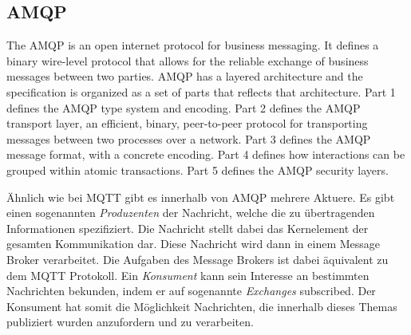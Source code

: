 \subsection{AMQP}

\begin{definition}
    The \ac{AMQP} is an open internet protocol for business messaging. It defines a binary wire-level protocol that allows for the reliable exchange of business messages between two parties. AMQP has a layered architecture and the specification is organized as a set of parts that reflects that architecture. Part 1 defines the AMQP type system and encoding. Part 2 defines the AMQP transport layer, an efficient, binary, peer-to-peer protocol for transporting messages between two processes over a network. Part 3 defines the AMQP message format, with a concrete encoding. Part 4 defines how interactions can be grouped within atomic transactions. Part 5 defines the AMQP security layers.
\end{definition}

Ähnlich wie bei \ac{MQTT} gibt es innerhalb von \ac{AMQP} mehrere Aktuere. Es gibt einen sogenannten \textit{Produzenten} der Nachricht, welche die zu übertragenden Informationen spezifiziert. Die Nachricht stellt dabei das Kernelement der gesamten Kommunikation dar. Diese Nachricht wird dann in einem Message Broker verarbeitet. Die Aufgaben des Message Brokers ist dabei äquivalent zu dem \ac{MQTT} Protokoll. Ein \textit{Konsument} kann sein Interesse an bestimmten Nachrichten bekunden, indem er auf sogenannte \textit{Exchanges} subscribed. Der Konsument hat somit die Möglichkeit Nachrichten, die innerhalb dieses Themas publiziert wurden anzufordern und zu verarbeiten.


